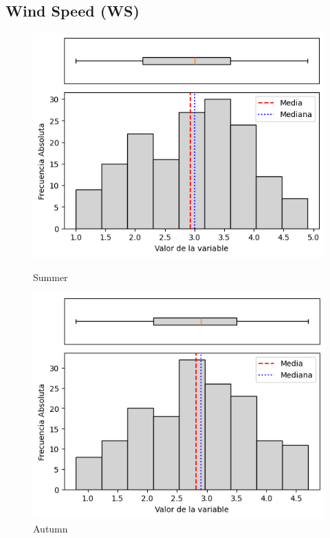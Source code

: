 \subsection{Wind Speed (WS)}

\begin{figure}[htbp]
\centering
\begin{minipage}{0.30\textwidth}
  \includegraphics[width=\linewidth]{resultados/por_estacion_del_anio/boxplot_clases_por_estacion/Ancachuro/WS_HistBoxplot_Summer.png}
  \caption*{Summer}
\end{minipage}
\hfill
\begin{minipage}{0.30\textwidth}
  \includegraphics[width=\linewidth]{resultados/por_estacion_del_anio/boxplot_clases_por_estacion/Ancachuro/WS_HistBoxplot_Autumn.png}
  \caption*{Autumn}
\end{minipage}


\end{figure}
